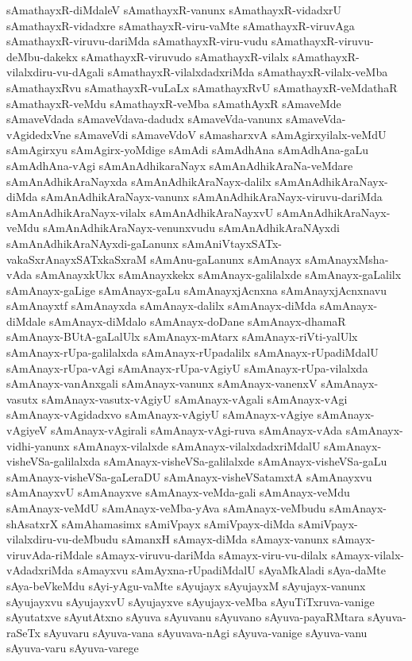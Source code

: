 {sAmathayxR-diMdaleV
sAmathayxR-vanunx
sAmathayxR-vidadxrU
sAmathayxR-vidadxre
sAmathayxR-viru-vaMte
sAmathayxR-viruvAga
sAmathayxR-viruvu-dariMda
sAmathayxR-viru-vudu
sAmathayxR-viruvu-deMbu-dakekx
sAmathayxR-viruvudo
sAmathayxR-vilalx
sAmathayxR-vilalxdiru-vu-dAgali
sAmathayxR-vilalxdadxriMda
sAmathayxR-vilalx-veMba
sAmathayxRvu
sAmathayxR-vuLaLx
sAmathayxRvU
sAmathayxR-veMdathaR
sAmathayxR-veMdu
sAmathayxR-veMba
sAmathAyxR
sAmaveMde
sAmaveVdada
sAmaveVdava-dadudx
sAmaveVda-vanunx
sAmaveVda-vAgidedxVne
sAmaveVdi
sAmaveVdoV
sAmasharxvA
sAmAgirxyilalx-veMdU
sAmAgirxyu
sAmAgirx-yoMdige
sAmAdi
sAmAdhAna
sAmAdhAna-gaLu
sAmAdhAna-vAgi
sAmAnAdhikaraNayx
sAmAnAdhikAraNa-veMdare
sAmAnAdhikAraNayxda
sAmAnAdhikAraNayx-dalilx
sAmAnAdhikAraNayx-diMda
sAmAnAdhikAraNayx-vanunx
sAmAnAdhikAraNayx-viruvu-dariMda
sAmAnAdhikAraNayx-vilalx
sAmAnAdhikAraNayxvU
sAmAnAdhikAraNayx-veMdu
sAmAnAdhikAraNayx-venunxvudu
sAmAnAdhikAraNAyxdi
sAmAnAdhikAraNAyxdi-gaLanunx
sAmAniVtayxSATx-vakaSxrAnayxSATxkaSxraM
sAmAnu-gaLanunx
sAmAnayx
sAmAnayxMsha-vAda
sAmAnayxkUkx
sAmAnayxkekx
sAmAnayx-galilalxde
sAmAnayx-gaLalilx
sAmAnayx-gaLige
sAmAnayx-gaLu
sAmAnayxjAcnxna
sAmAnayxjAcnxnavu
sAmAnayxtf
sAmAnayxda
sAmAnayx-dalilx
sAmAnayx-diMda
sAmAnayx-diMdale
sAmAnayx-diMdalo
sAmAnayx-doDane
sAmAnayx-dhamaR
sAmAnayx-BUtA-gaLalUlx
sAmAnayx-mAtarx
sAmAnayx-riVti-yalUlx
sAmAnayx-rUpa-galilalxda
sAmAnayx-rUpadalilx
sAmAnayx-rUpadiMdalU
sAmAnayx-rUpa-vAgi
sAmAnayx-rUpa-vAgiyU
sAmAnayx-rUpa-vilalxda
sAmAnayx-vanAnxgali
sAmAnayx-vanunx
sAmAnayx-vanenxV
sAmAnayx-vasutx
sAmAnayx-vasutx-vAgiyU
sAmAnayx-vAgali
sAmAnayx-vAgi
sAmAnayx-vAgidadxvo
sAmAnayx-vAgiyU
sAmAnayx-vAgiye
sAmAnayx-vAgiyeV
sAmAnayx-vAgirali
sAmAnayx-vAgi-ruva
sAmAnayx-vAda
sAmAnayx-vidhi-yanunx
sAmAnayx-vilalxde
sAmAnayx-vilalxdadxriMdalU
sAmAnayx-visheVSa-galilalxda
sAmAnayx-visheVSa-galilalxde
sAmAnayx-visheVSa-gaLu
sAmAnayx-visheVSa-gaLeraDU
sAmAnayx-visheVSatamxtA
sAmAnayxvu
sAmAnayxvU
sAmAnayxve
sAmAnayx-veMda-gali
sAmAnayx-veMdu
sAmAnayx-veMdU
sAmAnayx-veMba-yAva
sAmAnayx-veMbudu
sAmAnayx-shAsatxrX
sAmAhamasimx
sAmiVpayx
sAmiVpayx-diMda
sAmiVpayx-vilalxdiru-vu-deMbudu
sAmanxH
sAmayx-diMda
sAmayx-vanunx
sAmayx-viruvAda-riMdale
sAmayx-viruvu-dariMda
sAmayx-viru-vu-dilalx
sAmayx-vilalx-vAdadxriMda
sAmayxvu
sAmAyxna-rUpadiMdalU
sAyaMkAladi
sAya-daMte
sAya-beVkeMdu
sAyi-yAgu-vaMte
sAyujayx
sAyujayxM
sAyujayx-vanunx
sAyujayxvu
sAyujayxvU
sAyujayxve
sAyujayx-veMba
sAyuTiTxruva-vanige
sAyutatxve
sAyutAtxno
sAyuva
sAyuvanu
sAyuvano
sAyuva-payaRMtara
sAyuva-raSeTx
sAyuvaru
sAyuva-vana
sAyuvava-nAgi
sAyuva-vanige
sAyuva-vanu
sAyuva-varu
sAyuva-varege
}
